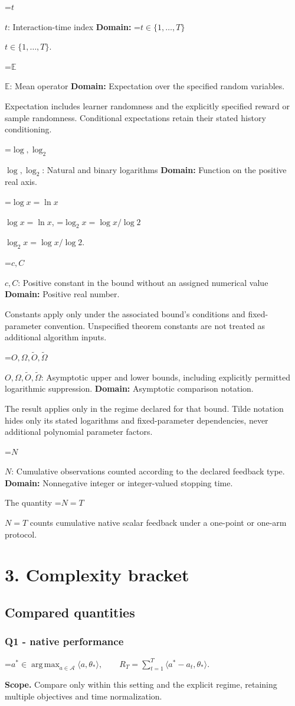 \documentclass[10pt,a4paper]{article}
\newcommand{\AtlasMath}[1]{\par\begingroup\centering\setbox0=\hbox{$\displaystyle #1$}\ifdim\wd0>1.4\linewidth\typeout{ATLAS WIDE FORMULA: \the\wd0}\fi\ifdim\wd0>\linewidth\resizebox{\linewidth}{!}{\box0}\else\box0\fi\par\endgroup}
\newcommand{\AtlasInlineMath}[1]{\begingroup\setbox0=\hbox{$#1$}\ifdim\wd0>.4\linewidth\endgroup\AtlasMath{#1}\else\endgroup$#1$\fi}
\begin{document}
\AtlasInlineMath{t}: Interaction-time index \textbf{Domain:} \AtlasInlineMath{t\in\{1,\ldots,T\}}.

\AtlasInlineMath{\mathbb E}: Mean operator \textbf{Domain:} Expectation over the specified random variables.

Expectation includes learner randomness and the explicitly specified reward or sample randomness. Conditional expectations retain their stated history conditioning.

\AtlasInlineMath{\log,\log_2}: Natural and binary logarithms \textbf{Domain:} Function on the positive real axis.

\AtlasInlineMath{\log x=\ln x}, \AtlasInlineMath{\log_2x=\log x/\log2}.

\AtlasInlineMath{c,C}: Positive constant in the bound without an assigned numerical value \textbf{Domain:} Positive real number.

Constants apply only under the associated bound’s conditions and fixed-parameter convention. Unspecified theorem constants are not treated as additional algorithm inputs.

\AtlasInlineMath{O,\Omega,\widetilde O,\widetilde\Omega}: Asymptotic upper and lower bounds, including explicitly permitted logarithmic suppression. \textbf{Domain:} Asymptotic comparison notation.

The result applies only in the regime declared for that bound. Tilde notation hides only its stated logarithms and fixed-parameter dependencies, never additional polynomial parameter factors.

\AtlasInlineMath{N}: Cumulative observations counted according to the declared feedback type. \textbf{Domain:} Nonnegative integer or integer-valued stopping time.

The quantity \AtlasInlineMath{N=T} counts cumulative native scalar feedback under a one-point or one-arm protocol.

\section{3. Complexity bracket}
\subsection{Compared quantities}
\subsubsection{Q1 - native performance}
\AtlasMath{a^*\in\operatorname*{arg\,max}_{a\in\mathcal A}\langle a,\theta_*\rangle,\qquad R_T=\sum_{t=1}^{T}\langle a^*-a_t,\theta_*\rangle.}
\textbf{Scope.} Compare only within this setting and the explicit regime, retaining multiple objectives and time normalization.
\end{document}
